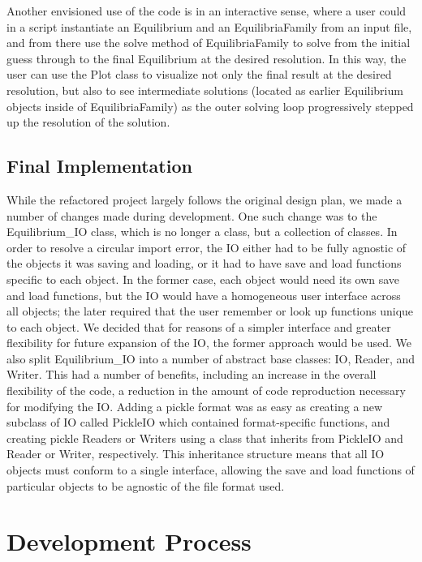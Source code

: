 \documentclass{article}
\begin{document}
Another envisioned use of the code is in an interactive sense, where a user could in a script instantiate an Equilibrium and an EquilibriaFamily from an input file, and from there use the solve method of EquilibriaFamily to solve from the initial guess through to the final Equilibrium at the desired resolution. In this way, the user can use the Plot class to visualize not only the final result at the desired resolution, but also to see intermediate solutions (located as earlier Equilibrium objects inside of EquilibriaFamily) as the outer solving loop progressively stepped up the resolution of the solution.

\subsection{Final Implementation}

While the refactored project largely follows the original design plan, we made a number of changes made during development.
One such change was to the Equilibrium\_IO class, which is no longer a class, but a collection of classes.
In order to resolve a circular import error, the IO either had to be fully agnostic of the objects it was saving and loading, or it had to have save and load functions specific to each object.
In the former case, each object would need its own save and load functions, but the IO would have a homogeneous user interface across all objects; the later required that the user remember or look up functions unique to each object.
We decided that for reasons of a simpler interface and greater flexibility for future expansion of the IO, the former approach would be used.
We also split Equilibrium\_IO into a number of abstract base classes: IO, Reader, and Writer.
This had a number of benefits, including an increase in the overall flexibility of the code, a reduction in the amount of code reproduction necessary for modifying the IO.
Adding a pickle format was as easy as creating a new subclass of IO called PickleIO which contained format-specific functions, and creating pickle Readers or Writers using a class that inherits from PickleIO and Reader or Writer, respectively.
This inheritance structure means that all IO objects must conform to a single interface, allowing the save and load functions of particular objects to be agnostic of the file format used.

\section{Development Process}
\end{document}
